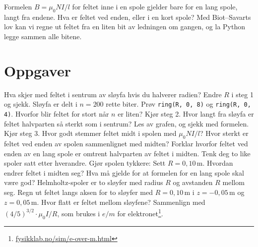 \documentclass[11pt]{article}
\begin{document}

Formelen $B = μ_{0}NI/l$ for feltet inne i en spole gjelder bare for en lang spole, langt fra endene. Hva er feltet ved enden, eller i en kort spole? Med Biot–Savarts lov kan vi regne ut feltet fra en liten bit av ledningen om gangen, og la Python legge sammen alle bitene.

\section*{Oppgaver}

\begin{oppgaveliste}
\oppgave {}Hva skjer med feltet i sentrum av sløyfa hvis du halverer radien? Endre $R$ i steg 1 og sjekk.
\svar
\oppgave {}Sløyfa er delt i $n = 200$ rette biter. Prøv \texttt{ring(R, 0, 8)} og \texttt{ring(R, 0, 4)}. Hvorfor blir feltet for stort når $n$ er liten?
\svar
\oppgave {}Kjør steg 2. Hvor langt fra sløyfa er feltet halvparten så sterkt som i sentrum? Les av grafen, og sjekk med formelen.
\svar
\oppgave {}Kjør steg 3. Hvor godt stemmer feltet midt i spolen med $μ_{0}NI/l$? Hvor sterkt er feltet ved enden av spolen sammenlignet med midten?
\svar
\oppgave {}Forklar hvorfor feltet ved enden av en lang spole er omtrent halvparten av feltet i midten. Tenk deg to like spoler satt etter hverandre.
\svar
\oppgave {}Gjør spolen tykkere: Sett $R = 0{,}10\,\mathrm{m}$. Hvordan endrer feltet i midten seg? Hva må gjelde for at formelen for en lang spole skal være god?
\svar
\oppgave {}Helmholtz-spoler er to sløyfer med radius $R$ og avstanden $R$ mellom seg. Regn ut feltet langs aksen for to sløyfer med $R = 0{,}10\,\mathrm{m}$ i $z = -0{,}05\,\mathrm{m}$ og $z = 0{,}05\,\mathrm{m}$. Hvor flatt er feltet mellom sløyfene? Sammenlign med $(4/5)^{3/2} \cdot μ_{0}I/R$, som brukes i $e/m$ for elektronet\footnote{\url{fysikklab.no/sim/e-over-m.html}}.
\svar
\end{oppgaveliste}
\end{document}
